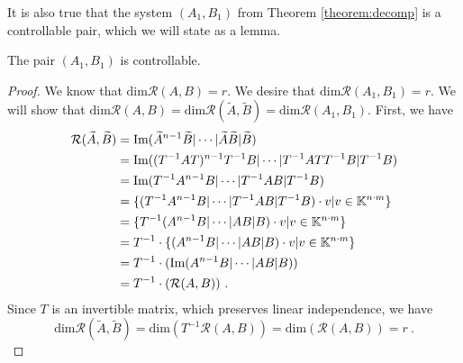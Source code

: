 It is also true that the system $(A_1,B_1)$ from Theorem \ref{theorem:decomp} is a controllable pair, which we will state as a lemma.

\begin{lemma}
	\label{lem:A_1B_1controllable}
	The pair $(A_1,B_1)$ is controllable.
\end{lemma}

\begin{proof}
	We know that $\text{dim}\mathcal{R}(A,B)=r$. We desire that $\text{dim}\mathcal{R}(A_1,B_1)=r$. We will show that $\text{dim}\mathcal{R}(A,B)=\text{dim}\mathcal{R}(\widetilde{A},\widetilde{B})=\text{dim}\mathcal{R}(A_1,B_1)$. 
	First, we have 
	\begin{align*}
		\mathcal{R}(\widetilde{A},\widetilde{B})&=\text{Im}(\widetilde{A}^{n-1}\widetilde{B}|\cdots|\widetilde{A}\widetilde{B}|\widetilde{B}) \\
		&=\text{Im}((T^{-1}AT)^{n-1}T^{-1}B|\cdots|T^{-1}ATT^{-1}B|T^{-1}B) \\
		&=\text{Im}(T^{-1}A^{n-1}B|\cdots|T^{-1}AB|T^{-1}B) \\
		&=\{(T^{-1}A^{n-1}B|\cdots|T^{-1}AB|T^{-1}B)\cdot v | v \in \mathbb{K}^{n\cdot m}\} \\
		&=\{T^{-1}(A^{n-1}B|\cdots|AB|B)\cdot v | v \in \mathbb{K}^{n\cdot m}\} \\
		&=T^{-1}\cdot\{(A^{n-1}B|\cdots|AB|B)\cdot v | v \in \mathbb{K}^{n\cdot m}\} \\
		&=T^{-1}\cdot(\text{Im}(A^{n-1}B|\cdots|AB|B)) \\
		&=T^{-1}\cdot(\mathcal{R}(A,B))
		\ .
	\end{align*}
	Since $T$ is an invertible matrix, which preserves linear independence, we have
	$$\text{dim}\mathcal{R}(\widetilde{A},\widetilde{B})=\text{dim}(T^{-1}\mathcal{R}(A,B))=\text{dim}(\mathcal{R}(A,B))=r\ .$$


\end{proof}
